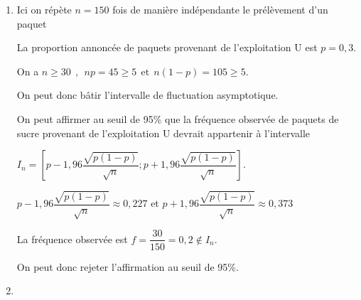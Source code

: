 \documentclass[11pt,a4paper,answers,fancyhdr]{exam}
\begin{document}
\begin{enumerate}
\item %


\begin{solution}
Ici on répète $n=150$ fois de manière indépendante le prélèvement d'un paquet 
	
La proportion annoncée de paquets provenant de l'exploitation U est $p = 0,3$.
	
On a $n\geqslant 30~~,~~np=45\geqslant 5~~\text{et}~~n(1-p)=105\geqslant 5$.
	
On peut donc bâtir l'intervalle de fluctuation asymptotique.
	
On peut affirmer au seuil de 95\% que la fréquence observée de paquets de sucre provenant de l'exploitation U devrait appartenir à l'intervalle 

$I_n=\left[ p-1,96 \dfrac{\sqrt{p(1-p)}}{\sqrt{n}}   ; p+1,96 \dfrac{\sqrt{p(1-p)}}{\sqrt{n}}  \right]$.
	
$p - 1,96 \dfrac{\sqrt{p(1-p)}}{\sqrt{n}} \approx 0,227$ et $p+1,96 \dfrac{\sqrt{p(1-p)}}{\sqrt{n}} \approx 0,373$
	
La fréquence observée est $f=\dfrac{30}{150}=0,2 \notin I_n$.
	
On peut donc rejeter l'affirmation au seuil de 95\%. 
\end{solution}
\item  %




\end{enumerate}
\end{document}
